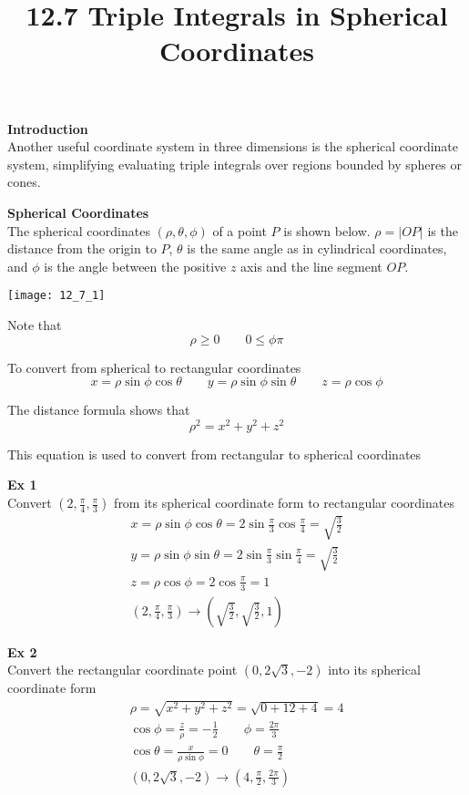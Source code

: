 \documentclass{article}
\title{12.7 Triple Integrals in Spherical Coordinates}
\begin{document}
  \maketitle
  \textbf{Introduction}\\
  Another useful coordinate system in three dimensions is the spherical coordinate system, simplifying evaluating triple integrals over regions bounded by spheres or cones.

  \textbf{Spherical Coordinates}\\
  The spherical coordinates $ (\rho,\theta,\phi) $ of a point $ P $ is shown below. $ \rho = | OP |$ is the distance from the origin to $ P $, $ \theta $ is the same angle as in cylindrical coordinates, and $ \phi $ is the angle between the positive $ z $ axis and the line segment $ OP $.

  \begin{center}
    \texttt{[image: 12\_7\_1]}
  \end{center}

  Note that
  \[
    \rho \ge 0 \qquad 0 \le \phi \pi
  \]

  To convert from spherical to rectangular coordinates
  \[
    x = \rho \sin{\phi}\cos{\theta} \qquad y=\rho\sin{\phi} \sin{\theta} \qquad z=\rho\cos{\phi}
  \]

  The distance formula shows that
  \[
    \rho ^{2} = x^{2}+y^{2}+z^{2}
  \]

  This equation is used to convert from rectangular to spherical coordinates

  \textbf{Ex 1}\\
  Convert $ (2,\frac{\pi}{4},\frac{\pi}{3}) $ from its spherical coordinate form to rectangular coordinates
 \[
   \begin{gathered}
   x=\rho \sin{\phi}\cos{\theta}= 2\sin{\frac{\pi}{3}}\cos{\frac{\pi}{4}}= \sqrt{\frac{3}{2}}\\
   y=\rho\sin{\phi}\sin{\theta} = 2\sin{\frac{\pi}{3}}\sin{\frac{\pi}{4}}=\sqrt{\frac{3}{2}}\\
   z=\rho\cos{\phi}=2\cos{\frac{\pi}{3}}=1\\
   \boxed{(2,\frac{\pi}{4},\frac{\pi}{3}) \to (\sqrt{\frac{3}{2}},\sqrt{\frac{3}{2}},1)} 
   \end{gathered}
 \]

 \textbf{Ex 2}\\
 Convert the rectangular coordinate point $ (0,2\sqrt{3}, -2) $ into its spherical coordinate form
 \[
   \begin{gathered}
   \rho = \sqrt{x^{2}+y^{2}+z^{2}} = \sqrt{0+12+4}=4\\
   \cos{\phi}= \frac{z}{\rho}=-\frac{1}{2} \qquad \phi = \frac{2\pi}{3}\\
   \cos{\theta}=\frac{x}{\rho\sin{\phi}}=0 \qquad \theta=\frac{\pi}{2}\\
   \boxed{(0,2\sqrt{3},-2 ) \to (4,\frac{\pi}{2},\frac{2\pi}{3})}
   \end{gathered}
 \]
 
\end{document}
